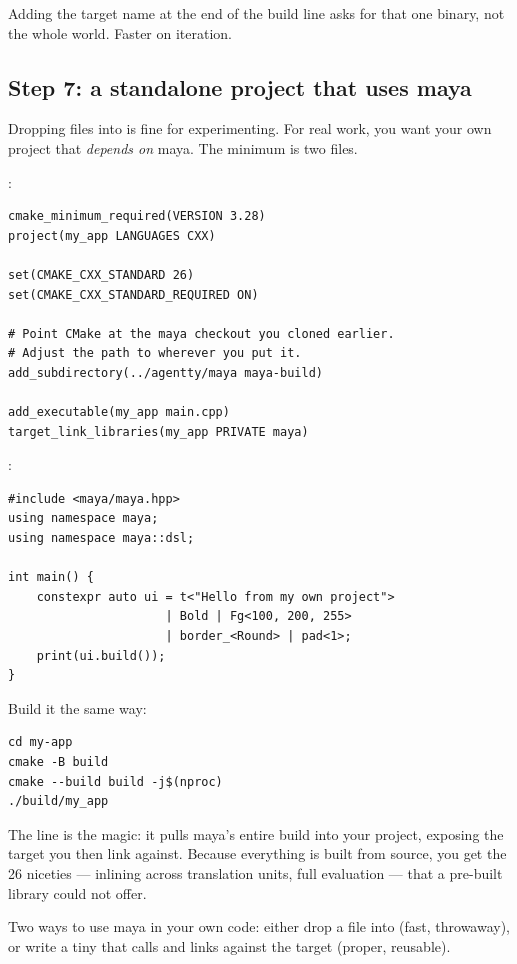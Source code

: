 Adding the target name  at the end of the build line
asks for that one binary, not the whole world. Faster on iteration.

\subsection{Step 7: a standalone project that uses maya}

Dropping files into  is fine for experimenting.
For real work, you want your own project that \emph{depends on}
maya. The minimum is two files.

:

\begin{lstlisting}[style=shell]
cmake_minimum_required(VERSION 3.28)
project(my_app LANGUAGES CXX)

set(CMAKE_CXX_STANDARD 26)
set(CMAKE_CXX_STANDARD_REQUIRED ON)

# Point CMake at the maya checkout you cloned earlier.
# Adjust the path to wherever you put it.
add_subdirectory(../agentty/maya maya-build)

add_executable(my_app main.cpp)
target_link_libraries(my_app PRIVATE maya)
\end{lstlisting}

:

\begin{lstlisting}
#include <maya/maya.hpp>
using namespace maya;
using namespace maya::dsl;

int main() {
    constexpr auto ui = t<"Hello from my own project">
                      | Bold | Fg<100, 200, 255>
                      | border_<Round> | pad<1>;
    print(ui.build());
}
\end{lstlisting}

Build it the same way:

\begin{lstlisting}[style=shell]
cd my-app
cmake -B build
cmake --build build -j$(nproc)
./build/my_app
\end{lstlisting}

The  line is the magic: it pulls maya's
entire build into your project, exposing the  target you
then link against. Because everything is built from source, you get
the \cpp{}26 niceties --- inlining across translation units, full
 evaluation --- that a pre-built library could not
offer.

\begin{idea}
Two ways to use maya in your own code: either drop a file into
 (fast, throwaway), or write a tiny
 that calls 
and links against the  target (proper, reusable).
\end{idea}

